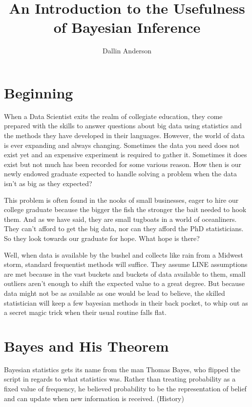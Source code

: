\documentclass[
  letterpaper,
  DIV=11,
  numbers=noendperiod]{scrartcl}
\title{An Introduction to the Usefulness of Bayesian Inference}
\author{Dallin Anderson}
\date{}
\begin{document}
\maketitle


\section{Beginning}\label{beginning}

When a Data Scientist exits the realm of collegiate education, they come
prepared with the skills to answer questions about big data using
statistics and the methods they have developed in their languages.
However, the world of data is ever expanding and always changing.
Sometimes the data you need does not exist yet and an expensive
experiment is required to gather it. Sometimes it does exist but not
much has been recorded for some various reason. How then is our newly
endowed graduate expected to handle solving a problem when the data
isn't as big as they expected?

This problem is often found in the nooks of small businesses, eager to
hire our college graduate because the bigger the fish the stronger the
bait needed to hook them. And as we have said, they are small tugboats
in a world of oceanliners. They can't afford to get the big data, nor
can they afford the PhD statisticians. So they look towards our graduate
for hope. What hope is there?

Well, when data is available by the bushel and collects like rain from a
Midwest storm, standard frequentist methods will suffice. They assume
LINE assumptions are met because in the vast buckets and buckets of data
available to them, small outliers aren't enough to shift the expected
value to a great degree. But because data might not be as available as
one would be lead to believe, the skilled statistician will keep a few
bayesian methods in their back pocket, to whip out as a secret magic
trick when their usual routine falls flat.

\section{Bayes and His Theorem}\label{bayes-and-his-theorem}

Bayesian statistics gets its name from the man Thomas Bayes, who flipped
the script in regards to what statistics was. Rather than treating
probability as a fixed value of frequency, he believed probability to be
the representation of belief and can update when new information is
received. (History)
\end{document}
